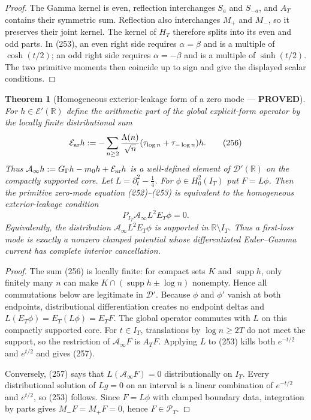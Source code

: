 \documentclass[11pt]{article}
\newtheorem{theorem}{Theorem}
\newcommand{\PROVED}{\textcolor{green!45!black}{\textbf{PROVED}}}
\begin{document}
\begin{proof}
The Gamma kernel is even, reflection interchanges $S_a$ and $S_{-a}$, and
$A_T$ contains their symmetric sum.  Reflection also interchanges $M_+$ and
$M_-$, so it preserves their joint kernel.  The kernel of $H_T$ therefore
splits into its even and odd parts.  In (253), an even right side requires
$\alpha=\beta$ and is a multiple of $\cosh(t/2)$; an odd right side requires
$\alpha=-\beta$ and is a multiple of $\sinh(t/2)$.  The two primitive moments
then coincide up to sign and give the displayed scalar conditions.
\end{proof}

\begin{theorem}[Homogeneous exterior-leakage form of a zero mode --- \PROVED]
For $h\in\mathcal E'(\mathbb R)$ define the arithmetic part of the global
explicit-form operator by the locally finite distributional sum
\begin{equation}
 \mathcal E_{\rm ar}h
 :=-\sum_{n\ge2}\frac{\Lambda(n)}{\sqrt n}
       (\tau_{\log n}+\tau_{-\log n})h.               \tag{256}
\end{equation}
Thus
$\mathcal A_\infty h:=G_\Gamma h-m_0h+\mathcal E_{\rm ar}h$
is a well-defined element of $\mathcal D'(\mathbb R)$ on the compactly
supported core.  Let $L=\partial_t^2-\tfrac14$.  For
$\phi\in H_0^2(I_T)$ put $F=L\phi$.  Then the primitive zero-mode equation
(252)--(253) is equivalent to the homogeneous exterior-leakage condition
\begin{equation}
 \boxed{P_{I_T}\mathcal A_\infty L^2E_T\phi=0.}       \tag{257}
\end{equation}
Equivalently, the distribution
$\mathcal A_\infty L^2E_T\phi$ is supported in
$\mathbb R\setminus I_T$.  Thus a first-loss mode is exactly a nonzero
clamped potential whose differentiated Euler--Gamma current has complete
interior cancellation.
\end{theorem}

\begin{proof}
The sum (256) is locally finite: for compact sets $K$ and
$\operatorname{supp}h$, only finitely many $n$ can make
$K\cap(\operatorname{supp}h\pm\log n)$ nonempty.  Hence all commutations
below are legitimate in $\mathcal D'$.  Because $\phi$ and $\phi'$ vanish at
both endpoints, distributional differentiation creates no endpoint deltas
and $L(E_T\phi)=E_T(L\phi)=E_TF$.  The global operator commutes with $L$ on
this compactly supported core.  For $t\in I_T$, translations by
$\log n\ge2T$ do not meet the support, so the restriction of
$\mathcal A_\infty F$ is $A_TF$.  Applying $L$ to (253) kills both
$e^{-t/2}$ and $e^{t/2}$ and gives (257).

Conversely, (257) says that $L(\mathcal A_\infty F)=0$ distributionally on
$I_T$.  Every distributional solution of $Lg=0$ on an interval is a linear
combination of $e^{-t/2}$ and $e^{t/2}$, so (253) follows.  Since
$F=L\phi$ with clamped boundary data, integration by parts gives
$M_-F=M_+F=0$, hence $F\in\mathcal P_T$.
\end{proof}
\end{document}
